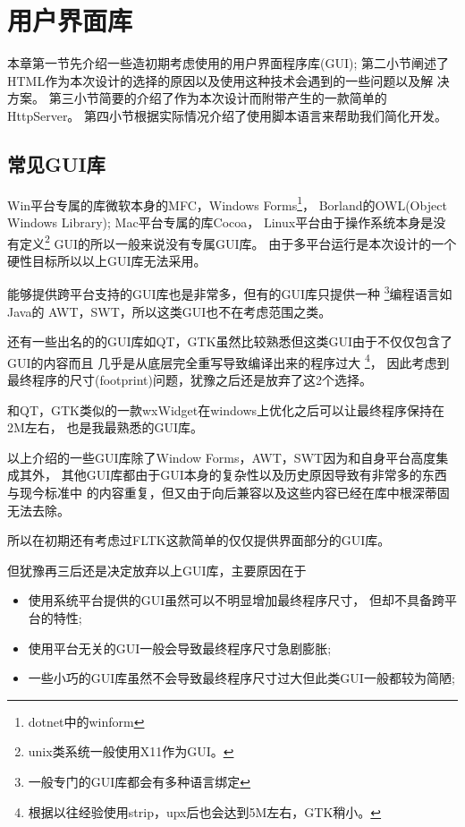 \chapter{用户界面库}
本章第一节先介绍一些造初期考虑使用的用户界面程序库(GUI);
第二小节阐述了HTML作为本次设计的选择的原因以及使用这种技术会遇到的一些问题以及解
决方案。
第三小节简要的介绍了作为本次设计而附带产生的一款简单的HttpServer。
第四小节根据实际情况介绍了使用脚本语言来帮助我们简化开发。
\section{常见GUI库}
Win平台专属的库微软本身的MFC，Windows Forms\footnote{dotnet中的winform}，
Borland的OWL(Object Windows Library);
Mac平台专属的库Cocoa，
Linux平台由于操作系统本身是没有定义\footnote{unix类系统一般使用X11作为GUI。}
GUI的所以一般来说没有专属GUI库。
由于多平台运行是本次设计的一个硬性目标所以以上GUI库无法采用。

能够提供跨平台支持的GUI库也是非常多，但有的GUI库只提供一种
\footnote{一般专门的GUI库都会有多种语言绑定}编程语言如Java的
AWT，SWT，所以这类GUI也不在考虑范围之类。

还有一些出名的的GUI库如QT，GTK虽然比较熟悉但这类GUI由于不仅仅包含了GUI的内容而且
几乎是从底层完全重写导致编译出来的程序过大
\footnote{根据以往经验使用strip，upx后也会达到5M左右，GTK稍小。}，
因此考虑到最终程序的尺寸(footprint)问题，犹豫之后还是放弃了这2个选择。

和QT，GTK类似的一款wxWidget在windows上优化之后可以让最终程序保持在2M左右，
也是我最熟悉的GUI库。

以上介绍的一些GUI库除了Window Forms，AWT，SWT因为和自身平台高度集成其外，
其他GUI库都由于GUI本身的复杂性以及历史原因导致有非常多的东西与现今标准中
的内容重复，但又由于向后兼容以及这些内容已经在库中根深蒂固无法去除。

所以在初期还有考虑过FLTK这款简单的仅仅提供界面部分的GUI库。

但犹豫再三后还是决定放弃以上GUI库，主要原因在于
\begin{itemize}
	\item 使用系统平台提供的GUI虽然可以不明显增加最终程序尺寸，
		但却不具备跨平台的特性;
	\item 使用平台无关的GUI一般会导致最终程序尺寸急剧膨胀;
	\item 一些小巧的GUI库虽然不会导致最终程序尺寸过大但此类GUI一般都较为简陋;
\end{itemize}

